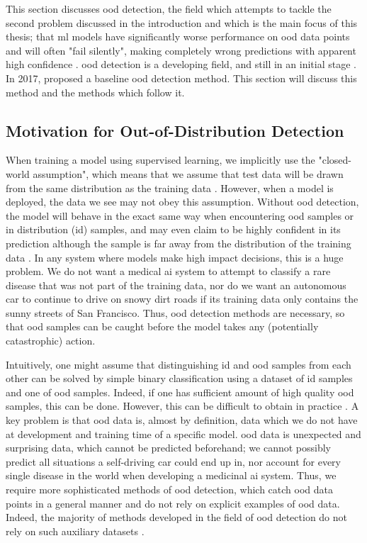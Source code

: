 \documentclass[UKenglish]{uiomasterthesis} %
\theoremstyle{definition}
\begin{document}
This section discusses \ac{ood} detection, the field which attempts to tackle the second problem discussed in the introduction and which is the main focus of this thesis; that \ac{ml} models have significantly worse performance on \ac{ood} data points and will often "fail silently", making completely wrong predictions with apparent high confidence \cite{adversarial}. \ac{ood} detection is a developing field, and still in an initial stage \cite{ooddl}. In 2017, \cite{oodbaseline} proposed a baseline \ac{ood} detection method. This section will discuss this method and the methods which follow it.

\subsection{Motivation for Out-of-Distribution Detection}

When training a model using supervised learning, we implicitly use the "closed-world assumption", which means that we assume that test data will be drawn from the same distribution as the training data \cite{oodoverview}. However, when a model is deployed, the data we see may not obey this assumption. Without \ac{ood} detection, the model will behave in the exact same way when encountering \ac{ood} samples or in distribution (\ac{id}) samples, and may even claim to be highly confident in its prediction although the sample is far away from the distribution of the training data \cite[1]{energy}. In any system where models make high impact decisions, this is a huge problem. We do not want a medical \ac{ai} system to attempt to classify a rare disease that was not part of the training data, nor do we want an autonomous car to continue to drive on snowy dirt roads if its training data only contains the sunny streets of San Francisco. Thus, \ac{ood} detection methods are necessary, so that \ac{ood} samples can be caught before the model takes any (potentially catastrophic) action.

Intuitively, one might assume that distinguishing \ac{id} and \ac{ood} samples from each other can be solved by simple binary classification using a dataset of \ac{id} samples and one of \ac{ood} samples. Indeed, if one has sufficient amount of high quality \ac{ood} samples, this can be done. However, this can be difficult to obtain in practice \cite[15]{oodoverview}. A key problem is that \ac{ood} data is, almost by definition, data which we do not have at development and training time of a specific model. \ac{ood} data is unexpected and surprising data, which cannot be predicted beforehand; we cannot possibly predict all situations a self-driving car could end up in, nor account for every single disease in the world when developing a medicinal \ac{ai} system. Thus, we require more sophisticated methods of \ac{ood} detection, which catch \ac{ood} data points in a general manner and do not rely on explicit examples of \ac{ood} data. Indeed, the majority of methods developed in the field of \ac{ood} detection do not rely on such auxiliary datasets \cite{openood}. %
\end{document}
